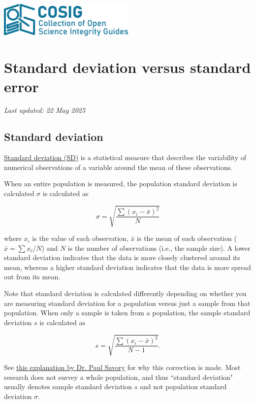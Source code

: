 \documentclass[letterpaper, 12pt]{article}
\begin{document}
\flushleft
\includegraphics[width=0.5\textwidth]{img/home/241017_final_logo_mockup.png}

\section*{Standard deviation versus standard error}
\textit{Last updated: 22 May 2025}

\subsection*{Standard deviation}

\href{https://en.wikipedia.org/wiki/Standard_deviation}{Standard deviation (SD)} is a statistical measure that describes the variability of numerical observations of a variable around the mean of these observations.

When an entire population is measured, the population standard deviation is calculated $\sigma$ is calculated as 

$$
\sigma = \sqrt{\frac{\sum(x_i - \bar{x})^2}{N}}
$$

where $x_i$ is the value of each observation, $\bar{x}$ is the mean of each observation ($\bar{x} = \sum x_i / N$) and $N$ is the number of observations (i.e., the sample size). A lower standard deviation indicates that the data is more closely clustered around its mean, whereas a higher standard deviation indicates that the data is more spread out from its mean.

Note that standard deviation is calculated differently depending on whether you are measuring standard deviation for a population versus just a sample from that population. When only a sample is taken from a population, the sample standard deviation $s$ is calculated as 

$$
s = \sqrt{\frac{\sum(x_i - \bar{x})^2}{N-1}}.
$$

See \href{https://digitalcommons.unl.edu/cgi/viewcontent.cgi?article=1008&context=imseteach}{this explanation by Dr. Paul Savory} for why this correction is made. Most research does not survey a whole population, and thus ``standard deviation" usually denotes sample standard deviation $s$ and not population standard deviation $\sigma$.
\end{document}
